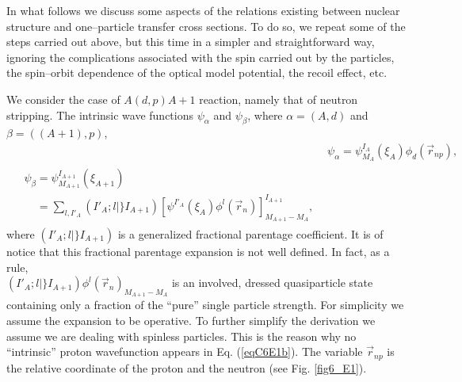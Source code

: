 \begin{subappendices}
In what follows we discuss some aspects of the relations existing between nuclear structure and one--particle transfer cross sections. To do so, we repeat some of the steps carried out above, but this time in a simpler and straightforward way, ignoring the complications associated with the spin carried out by the particles, the spin--orbit dependence of the optical model potential, the recoil effect, etc.

We consider the case of $A(d,p)A+1$ reaction, namely that of neutron stripping. The intrinsic wave functions $\psi_\alpha$ and $\psi_\beta$, where $\alpha=(A,d)$ and $\beta=((A+1),p)$,
\begin{subequations}
\begin{align}\label{eqC6E1}
&\psi_\alpha=\psi_{M_{A}}^{I_A}(\xi_A) \phi_d(\vec r_{np}),\\
\begin{split}\label{eqC6E1b}
&\psi_\beta=\psi_{M_{A+1}}^{I_{A+1}}(\xi_{A+1})\\
& \;\;\;\;=\sum_{l,I'_A} (I'_A;l \vert \} I_{A+1})
[\psi^{I'_A}(\xi_A)\phi^l(\vec r_{n})]_{M_{A+1}-M_A}^{I_{A+1}},
\end{split}
\end{align}
\end{subequations}
where $(I'_A;l \vert \} I_{A+1})$ is a generalized fractional parentage coefficient. It is of notice that this fractional parentage expansion is not well defined. In fact, as a rule,\\  \mbox{$(I'_A;l \vert \} I_{A+1})\phi^l(\vec r_{n})_{M_{A+1}-M_A}$} is an involved, dressed quasiparticle state containing only a fraction of the ``pure'' single particle strength. For simplicity we assume the expansion to be operative.	
To further simplify the derivation we assume we are dealing with spinless particles. This is the reason why no ``intrinsic'' proton wavefunction appears in Eq. (\ref{eqC6E1b}). The variable $\vec r_{np}$ is the relative coordinate of the proton and the neutron (see Fig. \ref{fig6_E1}).



\end{subappendices}
